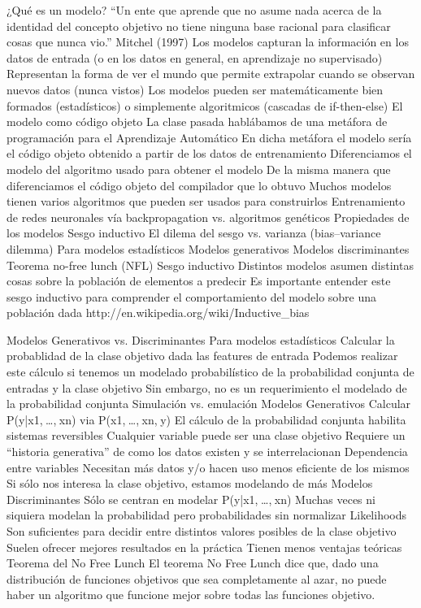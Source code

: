 ¿Qué es un modelo?
“Un ente que aprende que no asume nada acerca de la identidad del concepto objetivo no tiene ninguna base racional para clasificar cosas que nunca vio.”
Mitchel (1997)
Los modelos capturan la información en los datos de entrada (o en los datos en general, en aprendizaje no supervisado)
Representan la forma de ver el mundo que permite extrapolar cuando se observan nuevos datos (nunca vistos)
Los modelos pueden ser matemáticamente bien formados (estadísticos) o simplemente algoritmicos (cascadas de if-then-else)
El modelo como código objeto
La clase pasada hablábamos de una metáfora de programación para el Aprendizaje Automático
En dicha metáfora el modelo sería el código objeto obtenido a partir de los datos de entrenamiento
Diferenciamos el modelo del algoritmo usado para obtener el modelo
De la misma manera que diferenciamos el código objeto del compilador que lo obtuvo
Muchos modelos tienen varios algoritmos que pueden ser usados para construirlos
Entrenamiento de redes neuronales vía backpropagation vs. algoritmos genéticos
Propiedades de los modelos
Sesgo inductivo
El dilema del sesgo vs. varianza (bias–variance dilemma)
Para modelos estadísticos
Modelos generativos
Modelos discriminantes
Teorema no-free lunch (NFL)
Sesgo inductivo
Distintos modelos asumen distintas cosas sobre la población de elementos a predecir
Es importante entender este sesgo inductivo para comprender el comportamiento del modelo sobre una población dada
http://en.wikipedia.org/wiki/Inductive_bias


Modelos Generativos vs. Discriminantes
Para modelos estadísticos
Calcular la probablidad de la clase objetivo dada las features de entrada
Podemos realizar este cálculo si tenemos un modelado probabilístico de la probabilidad conjunta de entradas y la clase objetivo
Sin embargo, no es un requerimiento el modelado de la probabilidad conjunta
Simulación vs. emulación
Modelos Generativos
Calcular P(y|x1, …, xn) via P(x1, …, xn, y)
El cálculo de la probabilidad conjunta habilita sistemas reversibles
Cualquier variable puede ser una clase objetivo
Requiere un “historia generativa” de como los datos existen y se interrelacionan
Dependencia entre variables
Necesitan más datos y/o hacen uso menos eficiente de los mismos
Si sólo nos interesa la clase objetivo, estamos modelando de más
Modelos Discriminantes
Sólo se centran en modelar P(y|x1, …, xn)
Muchas veces ni siquiera modelan la probabilidad pero probabilidades sin normalizar
Likelihoods
Son suficientes para decidir entre distintos valores posibles de la clase objetivo
Suelen ofrecer mejores resultados en la práctica
Tienen menos ventajas teóricas
Teorema del No Free Lunch
El teorema No Free Lunch dice que, dado una distribución de funciones objetivos que sea completamente al azar, no puede haber un algoritmo que funcione mejor sobre todas las funciones objetivo.

